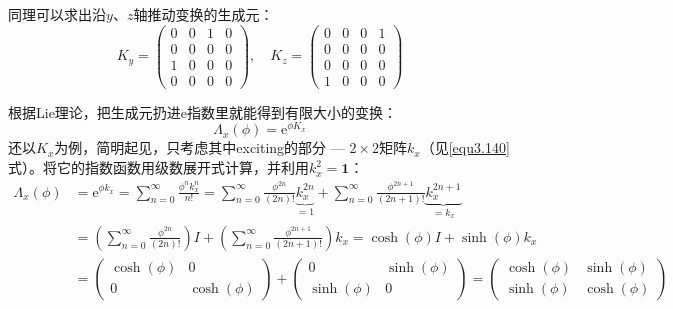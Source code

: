 同理可以求出沿$y$、$z$轴推动变换的生成元：
\begin{equation}
\label{equ3.142}
	K_y =
		\begin{pmatrix}
			0 & 0 & 1 & 0 \\
			0 & 0 & 0 & 0 \\
			1 & 0 & 0 & 0 \\
			0 & 0 & 0 & 0
		\end{pmatrix}
	, \quad
	K_z =
		\begin{pmatrix}
			0 & 0 & 0 & 1 \\
			0 & 0 & 0 & 0 \\
			0 & 0 & 0 & 0 \\
			1 & 0 & 0 & 0
		\end{pmatrix}
\end{equation}

根据Lie理论，把生成元扔进$\mathrm{e}$指数里就能得到有限大小的变换：
\[
	\Lambda_x(\phi) = \mathrm{e}^{\phi K_x}
\]
还以$K_x$为例，简明起见，只考虑其中exciting的部分 --- $2 \times 2$矩阵$k_x$（见\ref{equ3.140}式）。将它的指数函数用级数展开式计算，并利用$k_x^2 = \mathbf{1}$：
\begin{align}
	\Lambda_x(\phi) &= \mathrm{e}^{\phi k_x} = \sum_{n = 0}^{\infty} \frac{\phi^n k_x^n}{n!} = \sum_{n = 0}^{\infty} \frac{\phi^{2n}}{(2n)!} \underbrace{k_x^{2n}}_{=1} + \sum_{n = 0}^{\infty} \frac{\phi^{2n + 1}}{(2n + 1)!} \underbrace{k_x^{2n + 1}}_{=k_x} \nonumber \\
	&= \left( \sum_{n = 0}^{\infty} \frac{\phi^{2n}}{(2n)!} \right) I + \left( \sum_{n = 0}^{\infty} \frac{\phi^{2n + 1}}{(2n + 1)!} \right) k_x = \cosh(\phi) I + \sinh(\phi) k_x \nonumber \\
	\label{equ3.143}
	&=
		\begin{pmatrix}
			\cosh(\phi) & 0 \\
			0 & \cosh(\phi)
		\end{pmatrix}
	+
		\begin{pmatrix}
			0 & \sinh(\phi) \\
			\sinh(\phi) & 0
		\end{pmatrix}
	=
		\begin{pmatrix}
			\cosh(\phi) & \sinh(\phi) \\
			\sinh(\phi) & \cosh(\phi)
		\end{pmatrix}
\end{align}
